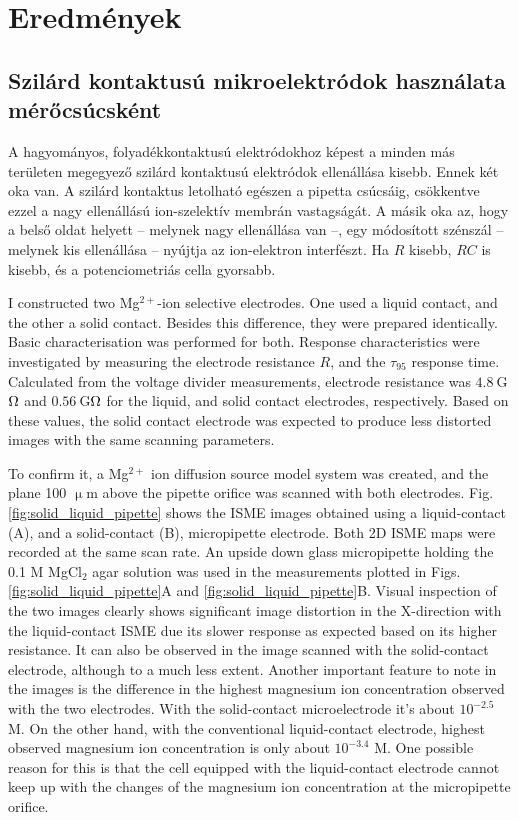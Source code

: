 \section{Eredmények}
\subsection{Szilárd kontaktusú mikroelektródok használata mérőcsúcsként}
A hagyományos, folyadékkontaktusú elektródokhoz képest a minden más területen megegyező szilárd kontaktusú elektródok ellenállása kisebb.
Ennek két oka van.
A szilárd kontaktus letolható egészen a pipetta csúcsáig, csökkentve ezzel a nagy ellenállású ion-szelektív membrán vastagságát.
A másik oka az, hogy a belső oldat helyett -- melynek nagy ellenállása van --, egy módosított szénszál -- melynek kis ellenállása -- nyújtja az ion-elektron interfészt.
Ha $R$ kisebb, $RC$ is kisebb, és a potenciometriás cella gyorsabb.


I constructed two Mg$^{2+}$-ion selective electrodes.
One used a liquid contact, and the other a solid contact.
Besides this difference, they were prepared identically.
Basic characterisation was performed for both.
Response characteristics were investigated by measuring the electrode resistance $R$, and the $\tau_{95}$ response time.
Calculated from the voltage divider measurements, electrode resistance was $4.8~$G$\ohm$ and $0.56~$G$\ohm$ for the liquid, and solid contact electrodes, respectively.
Based on these values, the solid contact electrode was expected to produce less distorted images with the same scanning parameters.

To confirm it, a Mg$^{2+}$ ion diffusion source model system was created, and the plane 100 $\upmu$m above the pipette orifice was scanned with both electrodes.
Fig. \ref{fig:solid_liquid_pipette} shows the ISME images obtained using a liquid-contact (A), and a solid-contact (B), micropipette electrode.
Both 2D ISME maps were recorded at the same scan rate.
An upside down glass micropipette holding the 0.1 M MgCl$_2$ agar solution was used in the measurements plotted in Figs. \ref{fig:solid_liquid_pipette}A and \ref{fig:solid_liquid_pipette}B.
Visual inspection of the two images clearly shows significant image distortion in the X-direction with the liquid-contact ISME due its slower response as expected based on its higher resistance.
It can also be observed in the image scanned with the solid-contact electrode, although to a much less extent.
Another important feature to note in the images is the difference in the highest magnesium ion concentration observed with the two electrodes.
With the solid-contact microelectrode it's about $10^{-2.5}$ M.
On the other hand, with the conventional liquid-contact electrode, highest observed magnesium ion concentration is only about $10^{-3.4}$ M.
One possible reason for this is that the cell equipped with the liquid-contact electrode cannot keep up with the changes of the magnesium ion concentration at the micropipette orifice.

